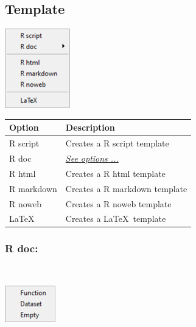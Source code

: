 \subsection{Template}

\includegraphics[scale=0.50]{./res/menu_file_template.png}\\

\begin{scriptsize}
  \begin{tabularx}{\textwidth}{>{\hsize=0.3\hsize}X>{\hsize=0.8\hsize}X}\\
    \hline
    \textbf{Option} & \textbf{Description} \\
    \hline
    R script & Creates a R script template \\
    R doc & \textit{\href{\#menu\_file\_template\_rdoc}{See options ...}} \\
    \hdashline[1pt/1pt]
    R html & Creates a R html template \\
    R markdown & Creates a R markdown template \\
    R noweb & Creates a R noweb template \\
    \hdashline[1pt/1pt]
    \LaTeX & Creates a \LaTeX ~template \\
    \hline
  \end{tabularx}
\end{scriptsize}


\newpage
\hypertarget{menu_file_template_rdoc}{}
\subsubsection{R doc:}\\

\includegraphics[scale=0.50]{./res/menu_file_template_rdoc.png}\\

